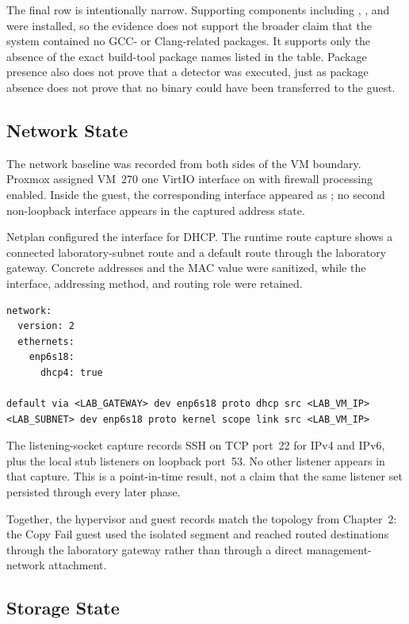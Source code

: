 The final row is intentionally narrow. Supporting components including
, , and
 were installed, so the evidence does not support the
broader claim that the system contained no GCC- or Clang-related packages. It
supports only the absence of the exact build-tool package names listed in the
table. Package presence also does not prove that a detector was executed, just
as package absence does not prove that no binary could have been transferred
to the guest.

\subsection{Network State}

The network baseline was recorded from both sides of the VM boundary. Proxmox
assigned VM~270 one VirtIO interface on  with firewall processing
enabled. Inside the guest, the corresponding interface appeared as
; no second non-loopback interface appears in the captured address
state.

Netplan configured the interface for DHCP. The runtime route capture shows a
connected laboratory-subnet route and a default route through the laboratory
gateway. Concrete addresses and the MAC value were sanitized, while the
interface, addressing method, and routing role were retained.

\begin{lstlisting}
network:
  version: 2
  ethernets:
    enp6s18:
      dhcp4: true

default via <LAB_GATEWAY> dev enp6s18 proto dhcp src <LAB_VM_IP>
<LAB_SUBNET> dev enp6s18 proto kernel scope link src <LAB_VM_IP>
\end{lstlisting}

The listening-socket capture records SSH on TCP port~22 for IPv4 and IPv6,
plus the local  stub listeners on loopback port~53. No
other listener appears in that capture. This is a point-in-time result, not a
claim that the same listener set persisted through every later phase.

Together, the hypervisor and guest records match the topology from Chapter~2:
the Copy Fail guest used the isolated  segment and reached routed
destinations through the laboratory gateway rather than through a direct
management-network attachment.

\subsection{Storage State}

